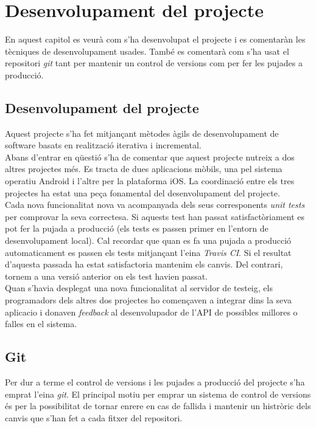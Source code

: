 \chapter{Desenvolupament del projecte}\label{desenvolupament}

En aquest capitol es veurà com s'ha desenvolupat el projecte i es comentaràn les tècniques de desenvolupament usades. També es comentarà com s'ha usat el repositori \emph{git} tant per mantenir un control de versions com per fer les pujades a producció.

\section{Desenvolupament del projecte}
Aquest projecte s'ha fet mitjançant mètodes àgils de desenvolupament de software basats en realització iterativa i incremental.\\

Abans d'entrar en qüestió s'ha de comentar que aquest projecte nutreix a dos altres projectes més. Es tracta de dues aplicacions mòbils, una pel sistema operatiu Android i l'altre per la plataforma iOS. La coordinació entre els tres projectes ha estat una peça fonamental del desenvolupament del projecte.\\

Cada nova funcionalitat nova va acompanyada dels seus corresponents \emph{unit tests} per comprovar la seva correctesa. Si aquests test han passat satisfactòriament es pot fer la pujada a producció (els tests es passen primer en l'entorn de desenvolupament local). Cal recordar que quan es fa una pujada a producció automaticament es passen els tests mitjançant l'eina \emph{Travis CI}. Si el resultat d'aquesta passada ha estat satisfactoria mantenim els canvis. Del contrari, tornem a una versió anterior on els test havien passat.\\

Quan s'havia desplegat una nova funcionalitat al servidor de testeig, els programadors dels altres dos projectes ho començaven a integrar dins la seva aplicacio i donaven \emph{feedback} al desenvolupador de l'\ac{API} de possibles millores o falles en el sistema.\\

\section{Git}

Per dur a terme el control de versions i les pujades a producció del projecte s'ha emprat l'eina \emph{git}. El principal motiu per emprar un sistema de control de versions és per la possibilitat de tornar enrere en cas de fallida i mantenir un histròric dels canvis que s'han fet a cada fitxer del repositori.\\

